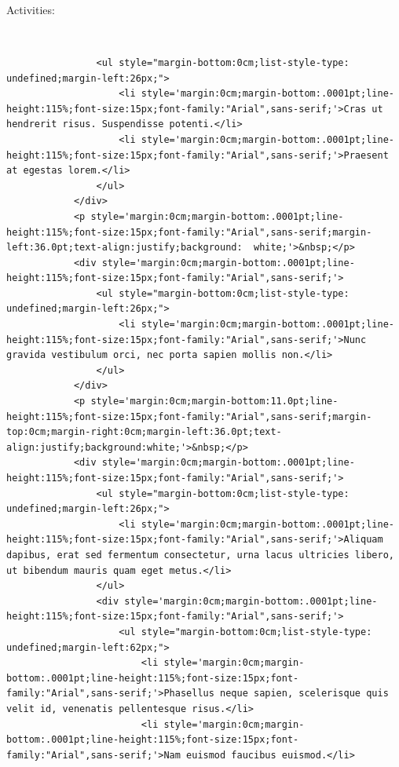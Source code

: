 \documentclass[
]{book}
\begin{document}
~

~

~

Activities:

~

\begin{verbatim}
                <ul style="margin-bottom:0cm;list-style-type: undefined;margin-left:26px;">
                    <li style='margin:0cm;margin-bottom:.0001pt;line-height:115%;font-size:15px;font-family:"Arial",sans-serif;'>Cras ut hendrerit risus. Suspendisse potenti.</li>
                    <li style='margin:0cm;margin-bottom:.0001pt;line-height:115%;font-size:15px;font-family:"Arial",sans-serif;'>Praesent at egestas lorem.</li>
                </ul>
            </div>
            <p style='margin:0cm;margin-bottom:.0001pt;line-height:115%;font-size:15px;font-family:"Arial",sans-serif;margin-left:36.0pt;text-align:justify;background:  white;'>&nbsp;</p>
            <div style='margin:0cm;margin-bottom:.0001pt;line-height:115%;font-size:15px;font-family:"Arial",sans-serif;'>
                <ul style="margin-bottom:0cm;list-style-type: undefined;margin-left:26px;">
                    <li style='margin:0cm;margin-bottom:.0001pt;line-height:115%;font-size:15px;font-family:"Arial",sans-serif;'>Nunc gravida vestibulum orci, nec porta sapien mollis non.</li>
                </ul>
            </div>
            <p style='margin:0cm;margin-bottom:11.0pt;line-height:115%;font-size:15px;font-family:"Arial",sans-serif;margin-top:0cm;margin-right:0cm;margin-left:36.0pt;text-align:justify;background:white;'>&nbsp;</p>
            <div style='margin:0cm;margin-bottom:.0001pt;line-height:115%;font-size:15px;font-family:"Arial",sans-serif;'>
                <ul style="margin-bottom:0cm;list-style-type: undefined;margin-left:26px;">
                    <li style='margin:0cm;margin-bottom:.0001pt;line-height:115%;font-size:15px;font-family:"Arial",sans-serif;'>Aliquam dapibus, erat sed fermentum consectetur, urna lacus ultricies libero, ut bibendum mauris quam eget metus.</li>
                </ul>
                <div style='margin:0cm;margin-bottom:.0001pt;line-height:115%;font-size:15px;font-family:"Arial",sans-serif;'>
                    <ul style="margin-bottom:0cm;list-style-type: undefined;margin-left:62px;">
                        <li style='margin:0cm;margin-bottom:.0001pt;line-height:115%;font-size:15px;font-family:"Arial",sans-serif;'>Phasellus neque sapien, scelerisque quis velit id, venenatis pellentesque risus.</li>
                        <li style='margin:0cm;margin-bottom:.0001pt;line-height:115%;font-size:15px;font-family:"Arial",sans-serif;'>Nam euismod faucibus euismod.</li>

\end{verbatim}
\end{document}
